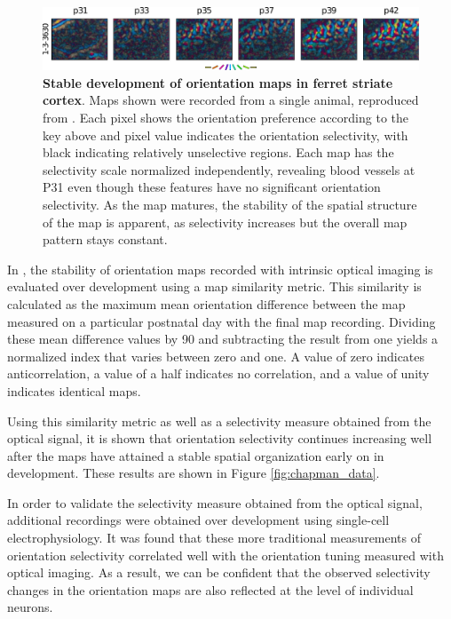\documentclass[phd,ianc,twoside]{infthesis}
\begin{document}
\begin{figure}
\center
\includegraphics[width=1.0\textwidth]{./figures/ferret_stability.pdf}
\caption{{\bf Stable development of orientation maps in ferret striate
    cortex}. Maps shown were recorded from a single animal, reproduced
  from \citet{chapman_jn96}. Each pixel shows the orientation preference
  according to the key above and pixel value indicates the
  orientation selectivity, with black indicating relatively
  unselective regions. Each map has the selectivity scale normalized
  independently, revealing blood vessels at P31 even though these
  features have no significant orientation selectivity. As the map
  matures, the stability of the spatial structure of the map is apparent,
  as selectivity increases but the overall map pattern stays constant.}
  \label{fig:ferret_stability}
\end{figure}


In \citet{chapman_jn96}, the stability of orientation maps recorded with
intrinsic optical imaging is evaluated over development using a map
similarity metric. This similarity is calculated as the maximum mean
orientation difference between the map measured on a particular
postnatal day with the final map recording. Dividing these mean
difference values by 90 and subtracting the result from one yields a
normalized index that varies between zero and one. A value of zero
indicates anticorrelation, a value of a half indicates no correlation,
and a value of unity indicates identical maps.

Using this similarity metric as well as a selectivity measure obtained
from the optical signal, it is shown that orientation selectivity
continues increasing well after the maps have attained a stable
spatial organization early on in development. These results are shown in
Figure \ref{fig:chapman_data}.

In order to validate the selectivity measure obtained from the optical
signal, additional recordings were obtained over development using
single-cell electrophysiology. It was found that these more traditional
measurements of orientation selectivity correlated well with the
orientation tuning measured with optical imaging. As a result, we can be
confident that the observed selectivity changes in the orientation maps
are also reflected at the level of individual neurons.
\end{document}
